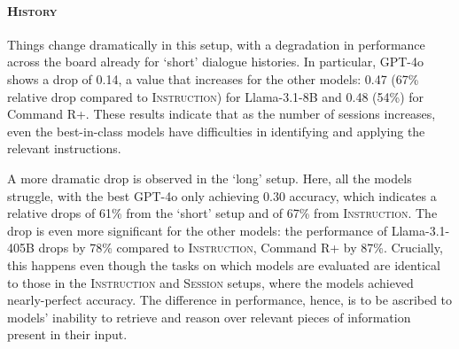 \paragraph{\textsc{History}} Things change dramatically in this setup, with a degradation in performance across the board already for `short' dialogue histories. In particular, GPT-4o shows a drop of 0.14,
a value that increases for the other models: 0.47 (67\% relative drop compared to \textsc{Instruction}) for Llama-3.1-8B and 0.48 (54\%) for Command R+. 
These results indicate that as the number of sessions increases, even the best-in-class models have difficulties in identifying and applying the relevant instructions. 

A more dramatic drop is observed in the `long' setup. Here, all the models struggle, with the best GPT-4o only achieving 0.30 accuracy,
which indicates a relative drops of 61\% from 
the `short' setup and of 
67\% 
from \textsc{Instruction}. 
The drop is even more significant for the other models: the performance of Llama-3.1-405B drops by 78\% compared to \textsc{Instruction}, Command R+ by 87\%.
Crucially, this happens even though the tasks on which models are evaluated are identical to those in the \textsc{Instruction} and \textsc{Session} setups, where the models achieved nearly-perfect accuracy. 
The difference in performance, hence, is to be ascribed to models' inability to retrieve and reason over 
relevant pieces of information present in their input. 


